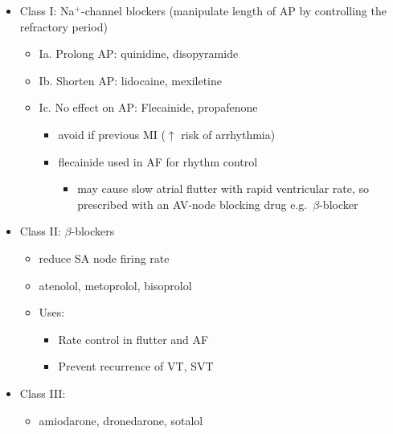 \documentclass[
  12pt,
]{memoir}
\providecommand{\tightlist}{%
  \setlength{\itemsep}{0pt}\setlength{\parskip}{0pt}}
\begin{document}
\begin{itemize}
\tightlist
\item
  Class I: Na\(^+\)-channel blockers (manipulate length of AP by
  controlling the refractory period)

  \begin{itemize}
  \tightlist
  \item
    Ia. Prolong AP: quinidine, disopyramide
  \item
    Ib. Shorten AP: lidocaine, mexiletine
  \item
    Ic. No effect on AP: Flecainide, propafenone

    \begin{itemize}
    \tightlist
    \item
      avoid if previous MI (\(\uparrow\) risk of arrhythmia)
    \item
      flecainide used in AF for rhythm control

      \begin{itemize}
      \tightlist
      \item
        may cause slow atrial flutter with rapid ventricular rate, so
        prescribed with an AV-node blocking drug e.g.~\(\beta\)-blocker
      \end{itemize}
    \end{itemize}
  \end{itemize}
\item
  Class II: \(\beta\)-blockers

  \begin{itemize}
  \tightlist
  \item
    reduce SA node firing rate
  \item
    atenolol, metoprolol, bisoprolol
  \item
    Uses:

    \begin{itemize}
    \tightlist
    \item
      Rate control in flutter and AF
    \item
      Prevent recurrence of VT, SVT
    \end{itemize}
  \end{itemize}
\item
  Class III:

  \begin{itemize}
  \tightlist
  \item
    amiodarone, dronedarone, sotalol


\end{itemize}
\end{itemize}
\end{document}
